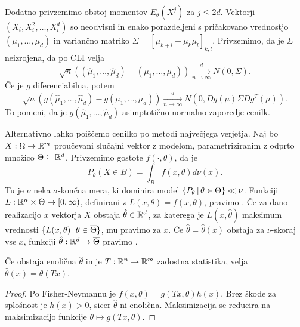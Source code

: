 Dodatno privzemimo obstoj momentov $E_\theta(X^j)$ za $j \le 2d$.
Vektorji $(X_i, X_i^2, \ldots, X_i^d)$ so neodvisni in enako porazdeljeni s
pričakovano vrednostjo $(\mu_1, \ldots, \mu_d)$ in variančno matriko $\Sigma =
[\mu_{k+l} - \mu_k \mu_l]_{k,l}$.
Privzemimo, da je $\Sigma$ neizrojena, da po CLI velja
\[
  \sqrt{n} \left( (\hat{\mu}_1, \ldots, \hat{\mu}_d) - (\mu_1, \ldots, \mu_d)
  \right)
  \xrightarrow[n \to \infty]{d} N(0, \Sigma).
\]
Če je $g$ diferenciabilna, potem
\[
  \sqrt{n} \left( g(\hat{\mu}_1, \ldots, \hat{\mu}_d) - g(\mu_1, \ldots, \mu_d)
  \right)
  \xrightarrow[n \to \infty]{d} N(0, Dg(\mu) \Sigma Dg^T(\mu)).
\]
To pomeni, da je $g(\hat{\mu}_1, \ldots, \hat{\mu}_d)$ asimptotično normalno
zaporedje cenilk.

Alternativno lahko poiščemo cenilko po metodi največjega verjetja.
Naj bo $X: \Omega \to \mathbb{R}^m$ proučevani slučajni vektor z modelom,
parametriziranim z odprto množico $\Theta \subseteq \mathbb{R}^d$.
Privzemimo gostote $f(\cdot, \theta)$, da je
\[
  P_\theta(X \in B) = \int_B f(x, \theta) d\nu(x).
\]
Tu je $\nu$ neka $\sigma$-končna mera, ki dominira model $\{P_\theta \,|\,
\theta \in \Theta\} \ll \nu$.
Funkciji $L: \mathbb{R}^n \times \Theta \to \left[0, \infty\right)$, definirani z $L(x, \theta)
= f(x, \theta)$, pravimo .
Če za dano realizacijo $x$ vektorja $X$ obstaja $\hat{\theta} \in \mathbb{R}^d$, za
katerega je $L(x, \hat{\theta})$ maksimum vrednosti $\{L(x, \theta) \,|\, \theta
\in \overline{\Theta}\}$, mu pravimo  za $x$.
Če $\hat{\theta} = \hat{\theta}(x)$ obstaja za $\nu$-skoraj vse $x$, funkciji
$\hat{\theta}: \mathbb{R}^d \to \overline{\Theta}$ pravimo .

\begin{trditev}
  Če obstaja enolična $\hat{\theta}$ in je $T: \mathbb{R}^n \to \mathbb{R}^m$ zadostna
  statistika, velja $\hat{\theta}(x) = \hat{\theta}(Tx)$.
\end{trditev}

\begin{proof}
  Po Fisher-Neymannu je $f(x, \theta) = g(Tx, \theta) h(x)$.
  Brez škode za splošnost je $h(x) > 0$, sicer $\hat{\theta}$ ni enolična.
  Maksimizacija se reducira na maksimizacijo funkcije $\theta \mapsto g(Tx,
  \theta)$.
\end{proof}

